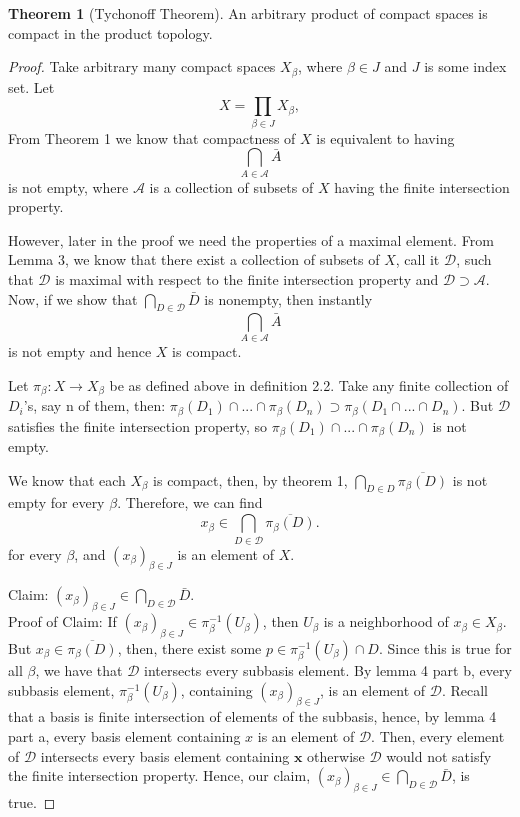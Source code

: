 \documentclass{article}
\theoremstyle{definition}
\newtheorem{theorem}{Theorem}
\begin{document}
\begin{theorem}[Tychonoff Theorem]
An arbitrary product of compact spaces is compact in the product topology.
\end{theorem}

\begin{proof}
Take arbitrary many compact spaces $X_\beta$, where $\beta \in J$ and $J$ is some index set. Let
\[
X = \prod_{\beta \in J} X_\beta,
\]
From Theorem 1 we know that compactness of $X$ is equivalent to having
\[
\bigcap_{A \in \mathcal{A}} \bar{A}
\]
is not empty, where $\mathcal{A}$ is a collection of subsets of $X$ having the finite intersection property.

However, later in the proof we need the properties of a maximal element.
From Lemma 3, we know that there exist a collection of subsets of $X$, call it $\mathcal{D}$, such that $\mathcal{D}$ is maximal with respect to the finite intersection property and $\mathcal{D} \supset \mathcal{A}$. Now, if we show that $\bigcap_{D \in \mathscr{D}} \bar{D}$ is nonempty, then instantly \[
\bigcap_{A \in \mathcal{A}} \bar{A}
\] is not empty and hence $X$ is compact.

Let $\pi_\beta: X \rightarrow X_\beta$ be as defined above in definition 2.2. Take any finite collection of $D_i$'s, say n of them, then: 
$\pi_\beta(D_1) \cap ... \cap \pi_\beta(D_n) \supset \pi_\beta(D_1 \cap ... \cap D_n)$. But $\mathcal{D}$ satisfies the finite intersection property, so $\pi_\beta(D_1) \cap ... \cap \pi_\beta(D_n)$ is not empty.


We know that each $X_\beta$ is compact, then, by theorem 1, $\bigcap_{D \in D} \overline{\pi_\beta(D)}$ is not empty for every $\beta$. Therefore, we can find 
\[
x_\beta \in \bigcap_{D \in \mathcal{D}} \overline{\pi_\beta(D)}.
\]
for every $\beta$, and $\left(x_\beta\right)_{\beta \in J}$ is an element of $X$.


Claim: $\left(x_\beta\right)_{\beta \in J} \in \bigcap_{D \in \mathscr{D}} \bar{D}$.\\
Proof of Claim: If $\left(x_\beta\right)_{\beta \in J} \in \pi_\beta^{-1}\left(U_\beta\right)$, then $U_\beta$ is a neighborhood of $x_\beta \in X_\beta$. But $x_\beta \in \overline{\pi_\beta(D)}$, then, there exist some $p \in \pi_\beta^{-1}\left(U_\beta\right) \cap D$. Since this is true for all $\beta$, we have that $\mathcal{D}$ intersects every subbasis element. By lemma 4 part b, every subbasis element, $\pi_\beta^{-1}\left(U_\beta\right)$, containing $\left(x_\beta\right)_{\beta \in J}$, is an element of $\mathcal{D}$. Recall that a basis is finite intersection of elements of the subbasis, hence, by lemma 4 part a, every basis element containing $x$ is an element of $\mathcal{D}$.
Then, every element of $\mathscr{D}$ intersects every basis element containing $\mathbf{x}$ otherwise $\mathscr{D}$ would not satisfy the finite intersection property. Hence, our claim, $\left(x_\beta\right)_{\beta \in J} \in \bigcap_{D \in \mathscr{D}} \bar{D}$, is true.


\end{proof}
\end{document}
